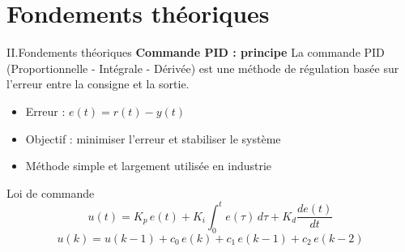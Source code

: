 \documentclass[aspectratio=169,12pt]{beamer}
\begin{document}
	\section{Fondements théoriques}
	\begin{frame}{\color{blue}II.Fondements théoriques}
		\textbf{\color{red} Commande PID : principe}
		La commande PID (Proportionnelle - Intégrale - Dérivée) est une 
		méthode de régulation basée sur l’erreur entre la consigne et la sortie.
		
		
		\vspace{4pt}
		
		\begin{itemize}
			\item Erreur : $e(t) = r(t) - y(t)$
			\item Objectif : minimiser l’erreur et stabiliser le système
			\item Méthode simple et largement utilisée en industrie
		\end{itemize}
		
		\vspace{6pt}
		
		\begin{block}{Loi de commande}
			\[
			u(t) = K_p\,e(t) + K_i \int_{0}^{t} e(\tau)\,d\tau + K_d \frac{de(t)}{dt}
			\]
			\[
			u(k)=u(k-1)+c_0\,e(k)+c_1\,e(k-1)+c_2\,e(k-2)
			\]
		\end{block}
		
	\end{frame}
\end{document}
